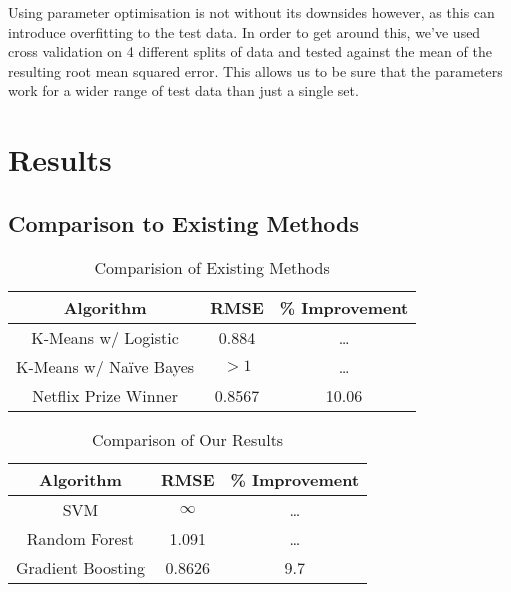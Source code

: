 \documentclass{report}
\begin{document}
	Using parameter optimisation is not without its downsides however, as this can introduce overfitting to the test data. In order to get around this, we’ve used cross validation on 4 different splits of data and tested against the mean of the resulting root mean squared error. This allows us to be sure that the parameters work for a wider range of test data than just a single set.
	
	\chapter{Results}
	\section{Comparison to Existing Methods}
	\begin{table}[H]
		\centering
	\begin{tabular}{ccc}
		\hline
		Algorithm & RMSE & \% Improvement\\
		\hline
		K-Means w/ Logistic & 0.884 & \dots	\\
		K-Means w/ Na\"ive Bayes & $>1$ & \dots\\
		Netflix Prize Winner & 0.8567 & 10.06\\
		\hline
	\end{tabular}
	\caption{Comparision of Existing Methods}
	\label{tab:pastresults}
	\end{table}
	\begin{table}[H]
		\centering
		\begin{tabular}{ccc}
			\hline
			Algorithm & RMSE & \% Improvement\\
			\hline
			SVM & $\infty$ & \dots	\\
			Random Forest & 1.091 & \dots\\
			Gradient Boosting & 0.8626 & 9.7\\
			\hline
		\end{tabular}
	\caption{Comparison of Our Results}
	\label{tab:ourresults}
	\end{table}
\end{document}

